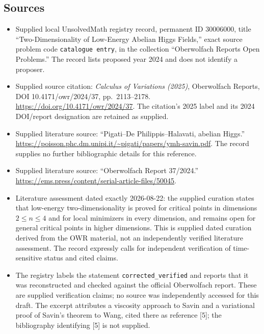 \documentclass[11pt]{article}
\begin{document}
\subsection{Sources}
\begin{itemize}
\item Supplied local UnsolvedMath registry record, permanent ID \(30006000\), title ``Two-Dimensionality of Low-Energy Abelian Higgs Fields,'' exact source problem code \texttt{catalogue entry}, in the collection ``Oberwolfach Reports Open Problems.'' The record lists proposed year 2024 and does not identify a proposer.
\item Supplied source citation: \emph{Calculus of Variations (2025)}, Oberwolfach Reports, DOI 10.4171/owr/2024/37, pp.\ 2113--2178. \url{https://doi.org/10.4171/owr/2024/37}. The citation's 2025 label and its 2024 DOI/report designation are retained as supplied.
\item Supplied literature source: ``Pigati--De Philippis--Halavati, abelian Higgs.'' \url{https://poisson.phc.dm.unipi.it/~pigati/papers/ymh-savin.pdf}. The record supplies no further bibliographic details for this reference.
\item Supplied literature source: ``Oberwolfach Report 37/2024.'' \url{https://ems.press/content/serial-article-files/50045}.
\item Literature assessment dated exactly 2026-08-22: the supplied curation states that low-energy two-dimensionality is proved for critical points in dimensions \(2\leq n\leq4\) and for local minimizers in every dimension, and remains open for general critical points in higher dimensions. This is supplied dated curation derived from the OWR material, not an independently verified literature assessment. The record expressly calls for independent verification of time-sensitive status and cited claims.
\item The registry labels the statement \texttt{corrected\_verified} and reports that it was reconstructed and checked against the official Oberwolfach report. These are supplied verification claims; no source was independently accessed for this draft. The excerpt attributes a viscosity approach to Savin and a variational proof of Savin's theorem to Wang, cited there as reference [5]; the bibliography identifying [5] is not supplied.
\end{itemize}
\end{document}
